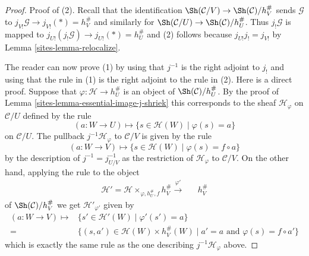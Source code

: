 \begin{proof}

Proof of (2). Recall that the identification
$\Sh(\mathcal{C}/V) \to \Sh(\mathcal{C})/h_V^\#$
sends $\mathcal{G}$ to $j_{V!}\mathcal{G} \to j_{V!}(*) = h_V^\#$
and similarly for
$\Sh(\mathcal{C}/U) \to \Sh(\mathcal{C})/h_U^\#$.
Thus $j_!\mathcal{G}$ is mapped to
$j_{U!}(j_!\mathcal{G}) \to j_{U!}(*) = h_U^\#$
and (2) follows because $j_{U!}j_! = j_{V!}$
by Lemma \ref{sites-lemma-relocalize}.

\medskip\noindent
The reader can now prove (1) by using that $j^{-1}$ is the
right adjoint to $j_!$ and using that the rule in (1)
is the right adjoint to the rule in (2). Here is a direct proof.
Suppose that $\varphi : \mathcal{H} \to h_U^\#$ is an object of
$\Sh(\mathcal{C})/h_U^\#$. By the proof of
Lemma \ref{sites-lemma-essential-image-j-shriek}
this corresponds to the sheaf
$\mathcal{H}_\varphi$ on $\mathcal{C}/U$ defined by the rule
$$
(a : W \to U)
\longmapsto
\{ s \in \mathcal{H}(W) \mid \varphi(s) = a\}
$$
on $\mathcal{C}/U$. The pullback $j^{-1}\mathcal{H}_\varphi$ to
$\mathcal{C}/V$ is given by the rule
$$
(a : W \to V)
\longmapsto
\{ s \in \mathcal{H}(W) \mid \varphi(s) = f \circ a\}
$$
by the description of $j^{-1} = j_{U/V}^{-1}$ as the restriction
of $\mathcal{H}_\varphi$ to $\mathcal{C}/V$.
On the other hand, applying the rule to the object
$$
\begin{array}{ccc}\mathcal{H}' = \mathcal{H} \times_{\varphi, h_U^\#, f} h_V^\#
\overset{\varphi'}{\longrightarrow} &  & h_V^\#\end{array}
$$
of $\Sh(\mathcal{C})/h_V^\#$
we get $\mathcal{H}'_{\varphi'}$
given by
\begin{align*}
(a : W \to V)
\longmapsto
&  \{ s' \in \mathcal{H}'(W) \mid \varphi'(s') = a\} \\
= &
\{ (s, a') \in \mathcal{H}(W) \times h_V^\#(W) \mid
a' = a \text{ and } \varphi(s) = f \circ a'\}
\end{align*}
which is exactly the same rule as the one describing
$j^{-1}\mathcal{H}_\varphi$ above.
\end{proof}

